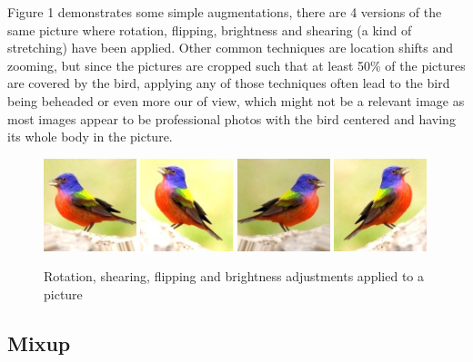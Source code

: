\documentclass{article}
\begin{document}
Figure 1 demonstrates some simple augmentations, there are 4 versions of the same picture where rotation, flipping, brightness and shearing (a kind of stretching) have been applied. Other common techniques are location shifts and zooming, but since the pictures are cropped such that at least 50\% of the pictures are covered by the bird, applying any of those techniques often lead to the bird being beheaded or even more our of view, which might not be a relevant image as most images appear to be professional photos with the bird centered and having its whole body in the picture.

\begin{figure}[h]
\includegraphics[width=0.24\textwidth]{aug1.jpeg}
\includegraphics[width=0.24\textwidth]{aug2.jpeg}
\includegraphics[width=0.24\textwidth]{aug3.jpeg}
\includegraphics[width=0.24\textwidth]{aug4.jpeg}
\caption{Rotation, shearing, flipping and brightness adjustments applied to a picture}
\end{figure}




\subsection{Mixup}
\end{document}
